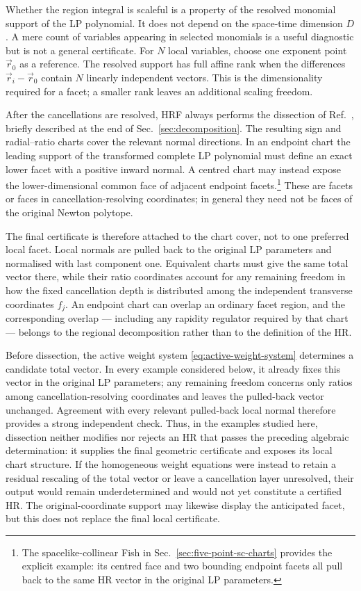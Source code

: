 \documentclass[a4paper,11pt]{article}
\begin{document}
Whether the region integral is scaleful is a property of the resolved
monomial support of the LP polynomial.  It does not depend on the
space-time dimension \(D\).  A mere count of variables appearing in selected
monomials is a useful diagnostic but is not a general certificate.
For \(N\) local variables, choose one exponent point \(\vec r_0\) as a
reference.  The resolved support has full affine rank when the differences
\(\vec r_i-\vec r_0\) contain \(N\) linearly independent vectors.  This is
the dimensionality required for a facet; a smaller rank leaves an additional
scaling freedom.

After the cancellations are resolved, HRF always performs the dissection of
Ref.~\cite{Gardi:2024axt}, briefly described at the end of
Sec.~\ref{sec:decomposition}.  The resulting sign and radial--ratio charts
cover the relevant normal directions.  In an endpoint chart the leading
support of the transformed complete LP polynomial must define an exact lower
facet with a positive inward normal.  A centred chart may instead expose the
lower-dimensional common face of adjacent endpoint facets.\footnote{The
spacelike-collinear Fish in Sec.~\ref{sec:five-point-sc-charts} provides the
explicit example: its centred face and two bounding endpoint facets all pull
back to the same HR vector in the original LP parameters.}  These are facets
or faces in cancellation-resolving coordinates; in general they need not be
faces of the original Newton polytope.

The final certificate is therefore attached to the chart cover, not to one
preferred local facet.  Local normals are pulled back to the original LP
parameters and normalised with last component one.  Equivalent charts must
give the same total vector there, while their ratio coordinates account for
any remaining freedom in how the fixed cancellation depth is distributed
among the independent transverse coordinates \(f_j\).  An
endpoint chart can overlap an ordinary facet region, and the corresponding
overlap --- including any rapidity regulator required by that chart --- belongs
to the regional decomposition rather than to the definition of the HR.

Before dissection, the active weight system
\eqref{eq:active-weight-system} determines a candidate total vector.  In
every example considered below, it already fixes this vector in the original
LP parameters; any remaining freedom concerns
only ratios among cancellation-resolving coordinates and leaves the pulled-back
vector unchanged.  Agreement with every relevant pulled-back local normal
therefore provides a strong independent check.  Thus, in the examples studied
here, dissection neither modifies nor rejects an HR that passes the preceding
algebraic determination: it supplies the final geometric certificate and
exposes its local chart structure.  If the homogeneous weight equations were
instead to retain a residual rescaling of the total vector or leave a
cancellation layer unresolved, their output would remain underdetermined and
would not yet constitute a certified HR.  The original-coordinate support may
likewise display the anticipated facet, but this does not replace the final
local certificate.
\end{document}
